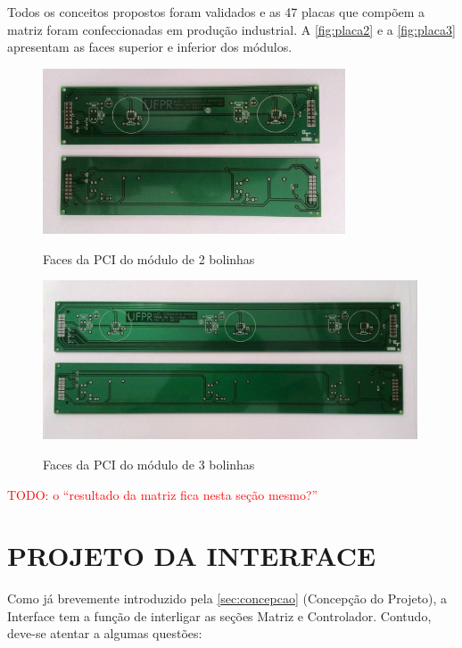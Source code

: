 Todos os conceitos propostos foram validados e as 47 placas que compõem a matriz foram confeccionadas em produção industrial. A \autoref{fig:placa2} e a \autoref{fig:placa3} apresentam as faces superior e inferior dos módulos.

\begin{figure}[H]
    \centering
    \caption{Faces da PCI do módulo de 2 bolinhas}
    \includegraphics[width=0.8\textwidth]{./dados/figuras/bloco-2}
    \label{fig:placa2}
\end{figure}

\begin{figure}[H]
    \centering
    \caption{Faces da PCI do módulo de 3 bolinhas}
    \includegraphics[width=0.99\textwidth]{./dados/figuras/bloco-3}
    \label{fig:placa3}
\end{figure}

\textcolor{red}{TODO: o ``resultado da matriz fica nesta seção mesmo?''}

\section{PROJETO DA INTERFACE}
\label{sec:interface}

Como já brevemente introduzido pela \autoref{sec:concepcao} (Concepção do Projeto), a Interface tem a função de interligar as seções Matriz e Controlador. Contudo, deve-se atentar a algumas questões:

